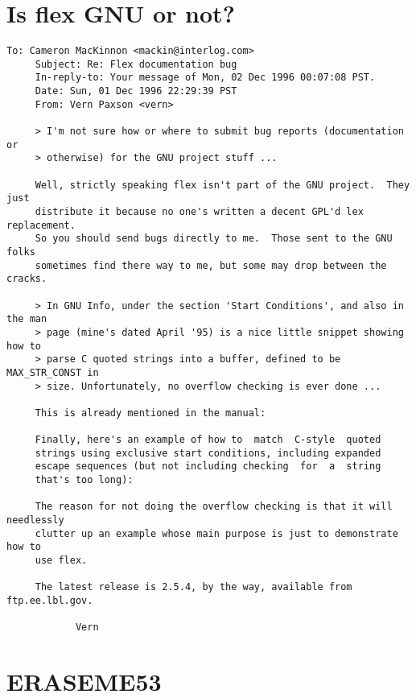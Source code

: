 \documentclass[openany,oneside]{book}
\begin{document}
\section{Is flex GNU or not?}

\begin{verbatim}
To: Cameron MacKinnon <mackin@interlog.com>
     Subject: Re: Flex documentation bug
     In-reply-to: Your message of Mon, 02 Dec 1996 00:07:08 PST.
     Date: Sun, 01 Dec 1996 22:29:39 PST
     From: Vern Paxson <vern>
     
     > I'm not sure how or where to submit bug reports (documentation or
     > otherwise) for the GNU project stuff ...
     
     Well, strictly speaking flex isn't part of the GNU project.  They just
     distribute it because no one's written a decent GPL'd lex replacement.
     So you should send bugs directly to me.  Those sent to the GNU folks
     sometimes find there way to me, but some may drop between the cracks.
     
     > In GNU Info, under the section 'Start Conditions', and also in the man
     > page (mine's dated April '95) is a nice little snippet showing how to
     > parse C quoted strings into a buffer, defined to be MAX_STR_CONST in
     > size. Unfortunately, no overflow checking is ever done ...
     
     This is already mentioned in the manual:
     
     Finally, here's an example of how to  match  C-style  quoted
     strings using exclusive start conditions, including expanded
     escape sequences (but not including checking  for  a  string
     that's too long):
     
     The reason for not doing the overflow checking is that it will needlessly
     clutter up an example whose main purpose is just to demonstrate how to
     use flex.
     
     The latest release is 2.5.4, by the way, available from ftp.ee.lbl.gov.
     
     		Vern
\end{verbatim}

\section{ERASEME53}
\end{document}
